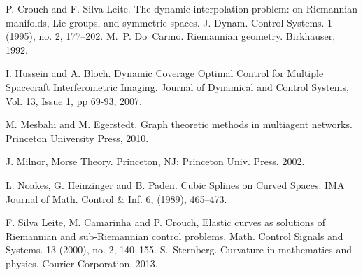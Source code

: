 \documentclass[letterpaper, 10 pt, conference]{ieeeconf}  %
\begin{document}
\begin{thebibliography}{1}
 P. Crouch and F. Silva Leite. The dynamic interpolation problem: on Riemannian manifolds, Lie groups, and symmetric spaces. J. Dynam. Control Systems. 1 (1995), no. 2, 177--202.
M.~P. Do~Carmo.
\newblock Riemannian geometry.
\newblock Birkhauser, 1992.


I. Hussein  and A. Bloch. Dynamic Coverage Optimal Control for Multiple Spacecraft Interferometric Imaging. Journal of Dynamical and Control Systems, Vol. 13, Issue 1, pp 69-93, 2007.




 M. Mesbahi and M. Egerstedt. Graph theoretic methods in multiagent networks. Princeton University Press, 2010.

 J. Milnor, Morse Theory.  Princeton, NJ: Princeton Univ. Press, 2002.








 L. Noakes, G. Heinzinger and B. Paden. Cubic Splines on
Curved Spaces. IMA Journal of Math. Control \& Inf. 6,
(1989), 465--473.

 F. Silva Leite, M. Camarinha and P. Crouch, Elastic curves as solutions of Riemannian and sub-Riemannian control problems. Math. Control Signals and Systems. 13 (2000), no. 2, 140--155.
S.~Sternberg.
\newblock  Curvature in mathematics and physics.
\newblock Courier Corporation, 2013.

\end{thebibliography}
\end{document}

